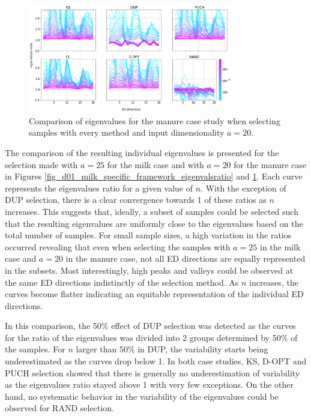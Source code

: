 \documentclass[journal=ancham,manuscript=article]{achemso}
\begin{document}
\begin{figure}[H]
\includegraphics[width=0.8\textwidth]{manuscript/figures/d02_manure_specific_framework_eigenvalsratio.png}
\centering
\caption{Comparison of eigenvalues for the manure case study when selecting samples with every method and input dimensionality $a=20$.}
\label{fig_d02_manure_specific_framework_eigenvalsratio}
\end{figure}

The comparison of the resulting individual eigenvalues is presented for the selection made with $a = 25$ for the milk case and with $a=20$ for the manure case in Figures \ref{fig_d01_milk_specific_framework_eigenvalsratio} and \ref{fig_d02_manure_specific_framework_eigenvalsratio}. Each curve represents the eigenvalues ratio for a given value of $n$. With the exception of DUP selection, there is a clear convergence towards 1 of these ratios as $n$ increases. This suggests that, ideally, a subset of samples could be selected such that the resulting eigenvalues are uniformly close to the eigenvalues based on the total number of samples. For small sample sizes, a high variation in the ratios occurred revealing that even when selecting the samples with $a=25$ in the milk case and $a=20$ in the manure case, not all ED directions are equally represented in the subsets. Most interestingly, high peaks and valleys could be observed at the same ED directions indistinctly of the selection method. As $n$ increases, the curves become flatter indicating an equitable representation of the individual ED directions. 

In this comparison, the 50\% effect of DUP selection was detected as the curves for the ratio of the eigenvalues was divided into 2 groups determined by 50\% of the samples. For $n$ larger than 50\% in DUP, the variability starts being underestimated as the curves drop below 1. In both case studies, KS, D-OPT and PUCH selection showed that there is generally no underestimation of variability as the eigenvalues ratio stayed above 1 with very few exceptions. On the other hand, no systematic behavior in the variability of the eigenvalues could be observed for RAND selection. 
\end{document}

